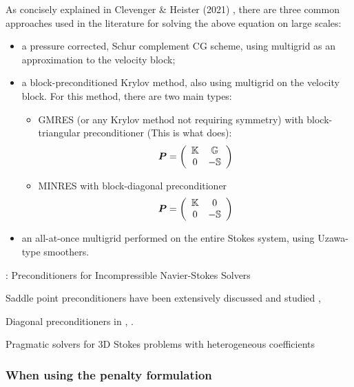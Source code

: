 As concisely explained in Clevenger \& Heister (2021) \cite{clhe21}, 
there are three common approaches used in the literature for solving the above equation on large scales:
\begin{itemize}
\item a pressure corrected, Schur complement CG scheme, using multigrid as an 
approximation to the velocity block;
\item a block-preconditioned Krylov
method, also using multigrid on the velocity block.
For this method, there are two main types:
\begin{itemize}
\item GMRES\cite{mabl15,rumi15} (or any Krylov method not requiring symmetry) with
block-triangular preconditioner (This is what \aspect does):
\[
{\bm P} = \left(
\begin{array}{cc}
{\mathbb{K}} & {\mathbb{G}} \\
0 & - {\mathbb{S}}
\end{array}
\right)
\]

\item MINRES\cite{gmhj16} with block-diagonal preconditioner
\[
{\bm P} = \left(
\begin{array}{cc}
{\mathbb{K}} & 0 \\
0 & - {\mathbb{S}}
\end{array}
\right)
\]

\end{itemize}


\item an all-at-once multigrid performed on the entire Stokes
system, using Uzawa-type smoothers.
\end{itemize}


\Literature: Preconditioners for Incompressible Navier-Stokes Solvers \cite{seuv10}

Saddle point preconditioners have been extensively discussed and studied \cite{bewa08}, \cite{dewu04}

Diagonal preconditioners in \cite{shrb01}, \cite{babc94}.

Pragmatic solvers for 3D Stokes problems with heterogeneous coefficients \cite{samb20}

\subsubsection{When using the penalty formulation}

